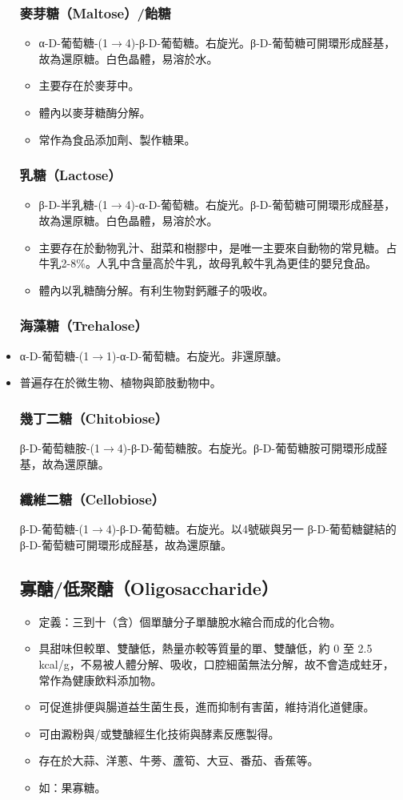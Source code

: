 \documentclass[a4paper,12pt]{report}
\begin{document}
\begin{itemize}
\subsubsection{麥芽糖（Maltose）/飴糖}
\begin{itemize}
\item α-D-葡萄糖-(1$\to$4)-β-D-葡萄糖。右旋光。β-D-葡萄糖可開環形成醛基，故為還原糖。白色晶體，易溶於水。
\item 主要存在於麥芽中。
\item 體內以麥芽糖酶分解。
\item 常作為食品添加劑、製作糖果。
\end{itemize}
\subsubsection{乳糖（Lactose）}
\begin{itemize}
\item β-D-半乳糖-(1$\to$4)-α-D-葡萄糖。右旋光。β-D-葡萄糖可開環形成醛基，故為還原糖。白色晶體，易溶於水。
\item 主要存在於動物乳汁、甜菜和樹膠中，是唯一主要來自動物的常見糖。占牛乳2-8\%。人乳中含量高於牛乳，故母乳較牛乳為更佳的嬰兒食品。
\item 體內以乳糖酶分解。有利生物對鈣離子的吸收。
\end{itemize}
\subsubsection{海藻糖（Trehalose）}
\bit
\item α-D-葡萄糖-(1$\to$1)-α-D-葡萄糖。右旋光。非還原醣。
\item 普遍存在於微生物、植物與節肢動物中。
\eit
\subsubsection{幾丁二糖（Chitobiose）}
β-D-葡萄糖胺-(1$\to$4)-β-D-葡萄糖胺。右旋光。β-D-葡萄糖胺可開環形成醛基，故為還原醣。
\subsubsection{纖維二糖（Cellobiose）}
β-D-葡萄糖-(1$\to$4)-β-D-葡萄糖。右旋光。以4號碳與另一 β-D-葡萄糖鍵結的β-D-葡萄糖可開環形成醛基，故為還原醣。
\subsection{寡醣/低聚醣（Oligosaccharide）}
\begin{itemize}
\item 定義：三到十（含）個單醣分子單醣脫水縮合而成的化合物。
\item 具甜味但較單、雙醣低，熱量亦較等質量的單、雙醣低，約 0 至 2.5 kcal/g，不易被人體分解、吸收，口腔細菌無法分解，故不會造成蛀牙，常作為健康飲料添加物。
\item 可促進排便與腸道益生菌生長，進而抑制有害菌，維持消化道健康。
\item 可由澱粉與/或雙醣經生化技術與酵素反應製得。
\item 存在於大蒜、洋蔥、牛蒡、蘆筍、大豆、番茄、香蕉等。
\item 如：果寡糖。
\end{itemize}

\end{itemize}
\end{document}
